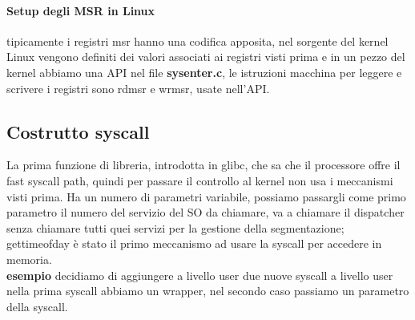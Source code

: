 \documentclass[12pt, oneside]{extbook}
\begin{document}
\paragraph{Setup degli MSR in Linux}tipicamente i registri msr hanno una codifica apposita, nel sorgente del kernel Linux vengono definiti dei valori associati ai registri visti prima e in un pezzo del kernel abbiamo una API nel file \textbf{sysenter.c}, le istruzioni macchina per leggere e scrivere i registri sono rdmsr e wrmsr, usate nell'API.
\subsection{Costrutto syscall}
La prima funzione di libreria, introdotta in glibc, che sa che il processore offre il fast syscall path, quindi per passare il controllo al kernel non usa i meccanismi visti prima. Ha un numero di parametri variabile, possiamo passargli come primo parametro il numero del servizio del SO da chiamare, va a chiamare il dispatcher senza chiamare tutti quei servizi per la gestione della segmentazione; gettimeofday è stato il primo meccanismo ad usare la syscall per accedere in memoria.\\ 
\textbf{esempio} decidiamo di aggiungere a livello user due nuove syscall a livello user nella prima syscall abbiamo un wrapper, nel secondo caso passiamo un parametro della syscall.
\end{document}
